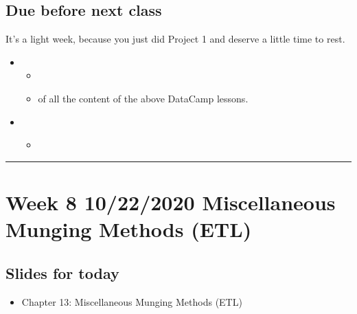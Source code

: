 \documentclass[letterpaper,10pt,english]{sphinxmanual}
\begin{document}
\subsection{Due before next class}
\label{\detokenize{course-schedule:id12}}
It’s a light week, because you just did Project 1 and deserve a little time to rest.
\begin{itemize}
\item {} 
\begin{itemize}
\item {} 

\item {} 
 of all the content of the above DataCamp lessons.

\end{itemize}

\item {} 
\begin{itemize}
\item {} 
{\hyperref[\detokenize{chapter-13-etl::doc}]{}}

\end{itemize}

\end{itemize}


\bigskip\hrule\bigskip



\section{Week 8 \sphinxhyphen{} 10/22/2020 \sphinxhyphen{} Miscellaneous Munging Methods (ETL)}
\label{\detokenize{course-schedule:week-8-10-22-2020-miscellaneous-munging-methods-etl}}

\subsection{Slides for today}
\label{\detokenize{course-schedule:id13}}\begin{itemize}
\item {} 
Chapter 13: Miscellaneous Munging Methods (ETL)

\end{itemize}
\end{document}
